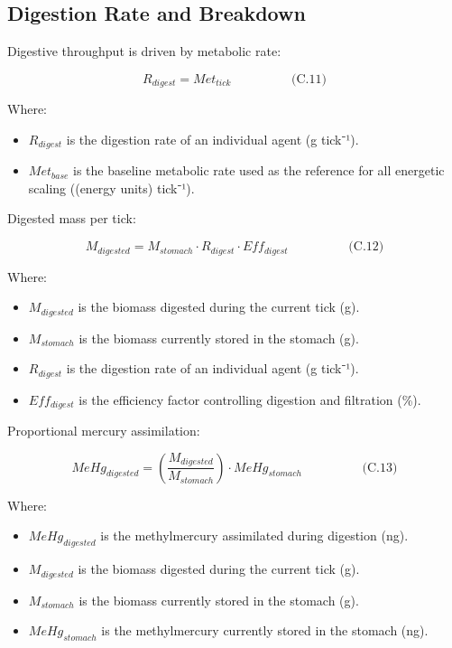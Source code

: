 \documentclass[
]{book}
\begin{document}
\subsection{Digestion Rate and Breakdown}\label{digestion-rate-and-breakdown}

Digestive throughput is driven by metabolic rate:

\[
\begin{equation} R_{digest} = Met_{tick}  \hspace{2cm} \text{(C.11)} \end{equation}
\]

Where:

\begin{itemize}
\item
  \(R_{digest}\) is the digestion rate of an individual agent (g
  tick⁻¹).
\item
  \(Met_{base}\) is the baseline metabolic rate used as the reference
  for all energetic scaling ((energy units) tick⁻¹).
\end{itemize}

Digested mass per tick:

\[
\begin{equation} M_{digested} = M_{stomach} \cdot R_{digest} \cdot Eff_{digest}  \hspace{2cm} \text{(C.12)} \end{equation}
\]

Where:

\begin{itemize}
\item
  \(M_{digested}\) is the biomass digested during the current tick (g).
\item
  \(M_{stomach}\) is the biomass currently stored in the stomach (g).
\item
  \(R_{digest}\) is the digestion rate of an individual agent (g
  tick⁻¹).
\item
  \(Eff_{digest}\) is the efficiency factor controlling digestion and
  filtration (\%).
\end{itemize}

Proportional mercury assimilation:

\[
\begin{equation} MeHg_{digested} = \left( \frac{M_{digested}}{M_{stomach}} \right) \cdot MeHg_{stomach}  \hspace{2cm} \text{(C.13)} \end{equation}
\]

Where:

\begin{itemize}
\item
  \(MeHg_{digested}\) is the methylmercury assimilated during digestion
  (ng).
\item
  \(M_{digested}\) is the biomass digested during the current tick (g).
\item
  \(M_{stomach}\) is the biomass currently stored in the stomach (g).
\item
  \(MeHg_{stomach}\) is the methylmercury currently stored in the
  stomach (ng).
\end{itemize}
\end{document}
